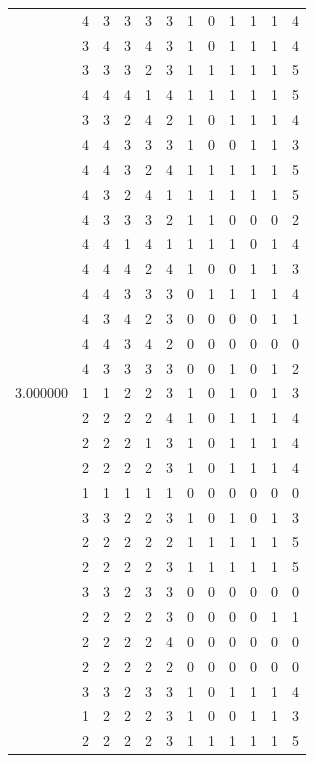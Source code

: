 \documentclass[]{book}
\theoremstyle{definition}
\theoremstyle{definition}
\theoremstyle{definition}
\theoremstyle{remark}
\begin{document}
\begin{table}
{\begin{tabular}[t]{rrrrrrrrrrrr}
 & 4 & 3 & 3 & 3 & 3 & 1 & 0 & 1 & 1 & 1 & 4\\
 & 3 & 4 & 3 & 4 & 3 & 1 & 0 & 1 & 1 & 1 & 4\\
 & 3 & 3 & 3 & 2 & 3 & 1 & 1 & 1 & 1 & 1 & 5\\
 & 4 & 4 & 4 & 1 & 4 & 1 & 1 & 1 & 1 & 1 & 5\\
 & 3 & 3 & 2 & 4 & 2 & 1 & 0 & 1 & 1 & 1 & 4\\
 & 4 & 4 & 3 & 3 & 3 & 1 & 0 & 0 & 1 & 1 & 3\\
 & 4 & 4 & 3 & 2 & 4 & 1 & 1 & 1 & 1 & 1 & 5\\
 & 4 & 3 & 2 & 4 & 1 & 1 & 1 & 1 & 1 & 1 & 5\\
 & 4 & 3 & 3 & 3 & 2 & 1 & 1 & 0 & 0 & 0 & 2\\
 & 4 & 4 & 1 & 4 & 1 & 1 & 1 & 1 & 0 & 1 & 4\\
 & 4 & 4 & 4 & 2 & 4 & 1 & 0 & 0 & 1 & 1 & 3\\
 & 4 & 4 & 3 & 3 & 3 & 0 & 1 & 1 & 1 & 1 & 4\\
 & 4 & 3 & 4 & 2 & 3 & 0 & 0 & 0 & 0 & 1 & 1\\
 & 4 & 4 & 3 & 4 & 2 & 0 & 0 & 0 & 0 & 0 & 0\\
 & 4 & 3 & 3 & 3 & 3 & 0 & 0 & 1 & 0 & 1 & 2\\
3.000000 & 1 & 1 & 2 & 2 & 3 & 1 & 0 & 1 & 0 & 1 & 3\\
 & 2 & 2 & 2 & 2 & 4 & 1 & 0 & 1 & 1 & 1 & 4\\
 & 2 & 2 & 2 & 1 & 3 & 1 & 0 & 1 & 1 & 1 & 4\\
 & 2 & 2 & 2 & 2 & 3 & 1 & 0 & 1 & 1 & 1 & 4\\
 & 1 & 1 & 1 & 1 & 1 & 0 & 0 & 0 & 0 & 0 & 0\\
 & 3 & 3 & 2 & 2 & 3 & 1 & 0 & 1 & 0 & 1 & 3\\
 & 2 & 2 & 2 & 2 & 2 & 1 & 1 & 1 & 1 & 1 & 5\\
 & 2 & 2 & 2 & 2 & 3 & 1 & 1 & 1 & 1 & 1 & 5\\
 & 3 & 3 & 2 & 3 & 3 & 0 & 0 & 0 & 0 & 0 & 0\\
 & 2 & 2 & 2 & 2 & 3 & 0 & 0 & 0 & 0 & 1 & 1\\
 & 2 & 2 & 2 & 2 & 4 & 0 & 0 & 0 & 0 & 0 & 0\\
 & 2 & 2 & 2 & 2 & 2 & 0 & 0 & 0 & 0 & 0 & 0\\
 & 3 & 3 & 2 & 3 & 3 & 1 & 0 & 1 & 1 & 1 & 4\\
 & 1 & 2 & 2 & 2 & 3 & 1 & 0 & 0 & 1 & 1 & 3\\
 & 2 & 2 & 2 & 2 & 3 & 1 & 1 & 1 & 1 & 1 & 5\\

\end{tabular}}
\end{table}
\end{document}
